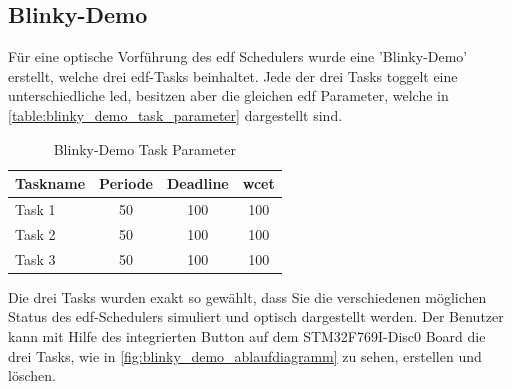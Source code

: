 \documentclass[../EDF Master Thesis.tex]{subfiles}
\begin{document}
    \clearpage
    \subsection{Blinky-Demo} \label{section:blinky_demo}
        Für eine optische Vorführung des \ac{edf} Schedulers wurde eine 'Blinky-Demo' erstellt, welche drei \ac{edf}-Tasks beinhaltet.
        Jede der drei Tasks toggelt eine unterschiedliche \ac{led}, besitzen aber die gleichen \ac{edf} Parameter, welche in \autoref{table:blinky_demo_task_parameter} dargestellt sind.

        \begin{table}[ht!]
            \centering
            \begin{tabular}{l|c|c|c}
                Taskname & Periode & Deadline & \ac{wcet} \\
                \hline
                Task 1 & 50 & 100 & 100\\
                Task 2 & 50 & 100 & 100\\
                Task 3 & 50 & 100 & 100\\
            \end{tabular}
            \caption{Blinky-Demo Task Parameter}
            \label{table:blinky_demo_task_parameter}
        \end{table}

        Die drei Tasks wurden exakt so gewählt, dass Sie die verschiedenen möglichen Status des \ac{edf}-Schedulers simuliert und optisch dargestellt werden.
        Der Benutzer kann mit Hilfe des integrierten Button auf dem STM32F769I-Disc0 Board die drei Tasks, wie in \autoref{fig:blinky_demo_ablaufdiagramm} zu sehen, erstellen und löschen.
        
\end{document}

